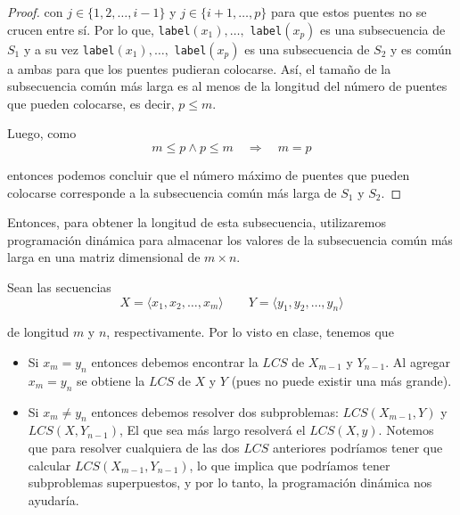 \documentclass[letterpaper,11pt]{article}
\begin{document}
\begin{enumerate}
\begin{proof}
        con $j \in \{1, 2, \ldots, i-1\}$ y $j \in \{i+1, \ldots, p\}$ para que 
        estos puentes no se crucen entre sí. Por lo que, \texttt{label}$(x_1), 
        \ldots, $ \texttt{label}$(x_p)$ es una subsecuencia de $S_1$ y a su vez 
        \texttt{label}$(x_1), \ldots, $ \texttt{label}$(x_p)$ es una subsecuencia
        de $S_2$ y es común a ambas para que los puentes pudieran colocarse. 
        Así, el tamaño de la subsecuencia común más larga es al menos de la 
        longitud del número de puentes que pueden colocarse, es decir, $p \leq m$.

        Luego, como 
        \begin{equation*}
            m \leq p \land p \leq m \quad \Rightarrow \quad m = p
        \end{equation*}

        entonces podemos concluir que el número máximo de puentes que pueden 
        colocarse corresponde a la subsecuencia común más larga de $S_1$ y 
        $S_2$.

    \end{proof}

    Entonces, para obtener la longitud de esta subsecuencia, utilizaremos 
    programación dinámica para almacenar los valores de la subsecuencia común 
    más larga en una matriz dimensional de $m \times n$. 
    
    Sean las secuencias 
    \begin{equation*}
        X = \langle x_1, x_2, \ldots, x_m \rangle \quad \quad 
        Y = \langle y_1, y_2, \ldots, y_n \rangle
    \end{equation*}

    de longitud $m$ y $n$, respectivamente. Por lo visto en clase, tenemos que 
    \begin{itemize}
        \item Si $x_m = y_n$ entonces debemos encontrar la $LCS$ de $X_{m-1}$ y 
        $Y_{n-1}$. Al agregar $x_m = y_n$ se obtiene la $LCS$ de $X$ y $Y$ (pues 
        no puede existir una más grande).

        \item Si $x_m \neq y_n$ entonces debemos resolver dos subproblemas: 
        $LCS(X_{m-1}, Y)$ y $LCS(X, Y_{n-1})$, El que sea más largo resolverá 
        el $LCS(X, y)$. Notemos que para resolver cualquiera de las dos $LCS$
        anteriores podríamos tener que calcular $LCS(X_{m-1}, Y_{n-1})$, lo 
        que implica que podríamos tener subproblemas superpuestos, y por lo 
        tanto, la programación dinámica nos ayudaría.
    \end{itemize}
    

\end{enumerate}
\end{document}
